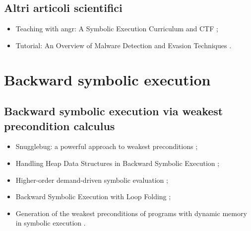 \subsection*{Altri articoli scientifici}
\begin{itemize}

\item Teaching with angr: A Symbolic Execution Curriculum and CTF \cite{springer2018teaching};

\item Tutorial: An Overview of Malware Detection and Evasion Techniques \cite{biondi2018tutorial}.

\end{itemize}

\section*{Backward symbolic execution}

\subsection*{Backward symbolic execution via weakest precondition calculus}
\begin{itemize}

\item Snugglebug: a powerful approach to weakest preconditions \cite{chandra2009bsewpc};

\item Handling Heap Data Structures in Backward Symbolic Execution \cite{husak2020bsewpc};

\item Higher-order demand-driven symbolic evaluation \cite{zachary2020bsewpc};

\item Backward Symbolic Execution with Loop Folding \cite{chalupa2021bsewpc};

\item Generation of the weakest preconditions of programs with dynamic memory in symbolic execution \cite{misonizhnik2022bsewpc}.

\end{itemize}